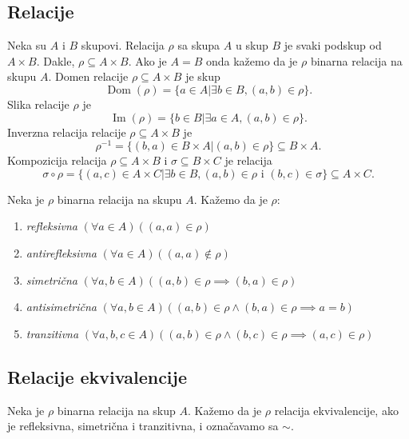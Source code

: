 \documentclass[12p,14paper]{article}
\DeclareMathOperator{\Dom}{Dom}
\DeclareMathOperator{\Ima}{Im}
\begin{document}
\begin{multicols}{2}
\section{Relacije}

    Neka su $A$ i $B$ skupovi. Relacija $\rho$ sa skupa $A$ u skup $B$ je 
    svaki podskup od $A \times B$. Dakle, $\rho \subseteq A \times B$. Ako je 
    $A = B$ onda kažemo da je $\rho$ binarna relacija na skupu $A$.
    Domen relacije $\rho \subseteq A \times B$ je skup
    \[\Dom (\rho) = \{ a \in A | \exists b \in B, (a, b) \in \rho\}.\]
    Slika relacije $\rho$ je
    \[\Ima (\rho) = \{ b \in B | \exists a \in A, (a, b) \in \rho\}.\]
    Inverzna relacija relacije $\rho \subseteq A \times B$ je
    \[
        \rho^{-1} = 
        \{ (b, a) \in B \times A | (a, b) \in \rho\} 
        \subseteq B \times A.
    \]
    Kompozicija relacija $\rho \subseteq A \times B$ i 
    $\sigma \subseteq B \times C$ je relacija
    \[
        \sigma \circ \rho =
        \{ (a,c) \in A \times C | 
        \exists b \in B, (a,b) \in \rho \text{ i } (b,c) \in \sigma\}
        \subseteq A \times C.
    \]

    Neka je $\rho$ binarna relacija na skupu $A$. Kažemo da je $\rho$:
    \begin{enumerate}[]
        \itemsep0em
        \item \textit{refleksivna}
            $(\forall a \in A)((a, a) \in \rho)$
        \item \textit{antirefleksivna}
            $(\forall a \in A)((a, a) \notin \rho)$
        \item \textit{simetrična}
            $(\forall a,b \in A)((a,b) \in \rho \implies (b,a) \in \rho)$
        \item \textit{antisimetrična}
            $(\forall a,b \in A)((a,b) \in \rho \land (b,a) \in \rho 
            \implies a = b)$
        \item \textit{tranzitivna} 
            $(\forall a,b,c \in A)((a,b) \in \rho \land (b,c) \in \rho 
            \implies (a,c) \in \rho)$
    \end{enumerate}

\subsection{Relacije ekvivalencije}

    Neka je $\rho$ binarna relacija na skup $A$. Kažemo da je $\rho$ relacija 
    ekvivalencije, ako je refleksivna, simetrična i tranzitivna, i označavamo 
    sa $\sim$.


\end{multicols}
\end{document}
